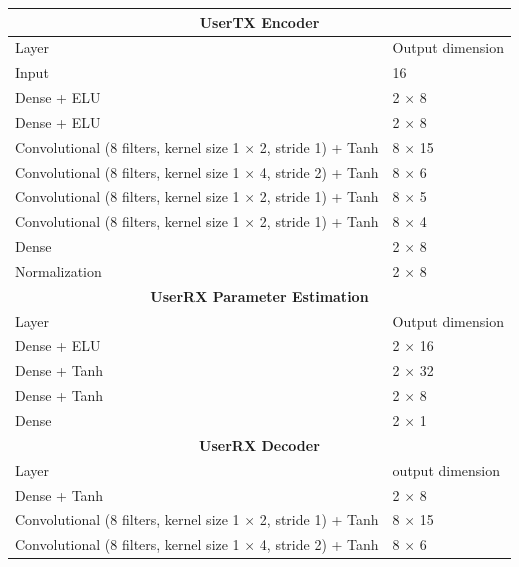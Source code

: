 \begin{table}[tp!]
	\begin{adjustbox}{width=0.9\columnwidth,center}
		\begin{tabular}{|l|l|} 
			\hline
			\multicolumn{2}{|c|}{\textbf{UserTX Encoder}} 															\\
			\hline
			Layer 																	&	Output dimension	\\
			\hline
			Input     												&	16    	 		    \\ 
			Dense + ELU          													&	2 $\times$ 8					\\
			Dense + ELU   															&	2 $\times$ 8		\\
			Convolutional (8 filters, kernel size 1 $\times$ 2, stride 1) + Tanh 	&   8 $\times$ 15		\\
			Convolutional (8 filters, kernel size 1 $\times$ 4, stride 2) + Tanh 	&   8 $\times$ 6		\\
			Convolutional (8 filters, kernel size 1 $\times$ 2, stride 1) + Tanh 	&   8 $\times$ 5		\\
			Convolutional (8 filters, kernel size 1 $\times$ 2, stride 1) + Tanh 	&   8 $\times$ 4		\\
			Dense																	&	2 $\times$ 8		\\
			Normalization															&	2 $\times$ 8		\\
			\hline   											
			\multicolumn{2}{|c|}{\textbf{UserRX Parameter Estimation}} 											\\
			\hline
						Layer 																	&	Output dimension	\\
						\hline
			Dense + ELU																&	2 $\times$ 16		\\
			Dense + Tanh															&	2 $\times$ 32		\\
			Dense + Tanh															&	2 $\times$ 8		\\
			Dense																	&	2 $\times$	1		\\
			\hline
			\hline
			\multicolumn{2}{|c|}{\textbf{UserRX Decoder}}															\\
			\hline
			Layer 																	&	output dimension	\\
			\hline
			Dense + Tanh          													&	2 $\times$ 8		\\
			Convolutional (8 filters, kernel size 1 $\times$ 2, stride 1) + Tanh 	&   8 $\times$ 15		\\
			Convolutional (8 filters, kernel size 1 $\times$ 4, stride 2) + Tanh 	&   8 $\times$ 6		\\

\end{tabular}
\end{adjustbox}
\end{table}
